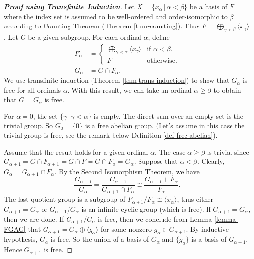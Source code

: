 \begin{proof}[\textbf{Proof using Transfinite Induction}]
	Let $X =  \{x_\alpha\,|\,\alpha < \beta\}$ be a basis of $F$ where the index set is assumed to be well-ordered and order-isomorphic to $\beta$ according to Counting Theorem (Theorem \ref{thm-counting}). Thus $F = \bigoplus_{\gamma < \beta} \langle x_\gamma \rangle$. Let $G$ be a given subgroup. For each ordinal $\alpha$, define 
	\begin{align*}
	F_\alpha &= 
	\begin{cases}
		\bigoplus_{\gamma < \alpha} \langle x_\gamma \rangle &\text{if } \alpha<\beta,\\
		F &\text{otherwise}. 
	\end{cases}
	\\
	G_\alpha &= G \cap F_\alpha.
	\end{align*}
	We use transfinite induction (Theorem \ref{thm-trans-induction}) to show that $G_\alpha$ is free for all ordinals $\alpha$. With this result,  we can take an ordinal $\alpha\geq \beta$ to obtain that $G = G_{\alpha}$ is free.
	
	For $\alpha=0$, the set $\{\gamma\,|\,\gamma < \alpha\}$ is empty. The direct sum over an empty set is the trivial group. So $G_0 = \{0\}$ is a free abelian group. (Let's assume in this case the trivial group is free, see the remark below Definition \ref{def-free-abelian}).
	
	Assume that the result holds  for a given ordinal $\alpha$. The case $\alpha\geq \beta$ is trivial since $G_{\alpha+1} = G\cap F_{\alpha+1} = G\cap F = G\cap F_{\alpha} = G_{\alpha}$. Suppose that $\alpha < \beta$. Clearly, $G_\alpha = G_{\alpha+1} \cap F_\alpha$. By the Second Isomorphism Theorem, we have 
	\begin{equation*}
		\frac{G_{\alpha+1}}{G_\alpha} = \frac{G_{\alpha+1}}{G_{\alpha+1} \cap F_\alpha} \cong \frac{G_{\alpha+1} + F_\alpha}{F_\alpha}.
	\end{equation*}  The last quotient group is a subgroup of $F_{\alpha+1}/F_\alpha \cong \langle x_\alpha \rangle$, thus either $G_{\alpha+1} = G_\alpha$ or $G_{\alpha+1}/G_\alpha$ is an infinite cyclic group (which is free). If $G_{\alpha+1} = G_\alpha$, then we are done. If $G_{\alpha+1}/G_\alpha$ is free, then   we conclude from Lemma \ref{lemma-FGAG} that $G_{\alpha+1} = G_\alpha \oplus \langle g_\alpha \rangle$ for some nonzero $g_\alpha \in G_{\alpha+1}$. By inductive hypothesis, $G_{\alpha}$ is free. So the union of a basis of $G_{\alpha}$ and $\{g_{\alpha}\}$ is a basis of $G_{\alpha+1}$. Hence $G_{\alpha+1}$ is free.
	

\end{proof}
